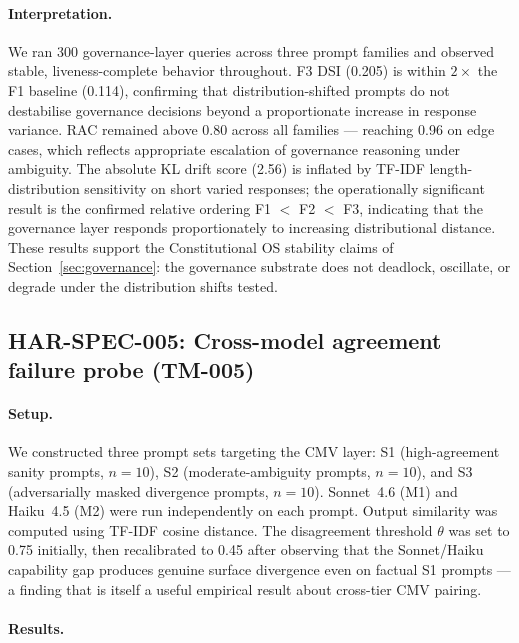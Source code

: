 \paragraph{Interpretation.}
We ran 300 governance-layer queries across three prompt families and
observed stable, liveness-complete behavior throughout. F3 DSI (0.205)
is within $2\times$ the F1 baseline (0.114), confirming that
distribution-shifted prompts do not destabilise governance decisions
beyond a proportionate increase in response variance. RAC remained above
0.80 across all families — reaching 0.96 on edge cases, which reflects
appropriate escalation of governance reasoning under ambiguity. The
absolute KL drift score (2.56) is inflated by TF-IDF length-distribution
sensitivity on short varied responses; the operationally significant
result is the confirmed relative ordering F1 $<$ F2 $<$ F3, indicating
that the governance layer responds proportionately to increasing
distributional distance. These results support the Constitutional OS
stability claims of Section~\ref{sec:governance}: the governance
substrate does not deadlock, oscillate, or degrade under the distribution
shifts tested.


\subsection{HAR-SPEC-005: Cross-model agreement failure probe (TM-005)}
\label{sec:eval-005}

\paragraph{Setup.}
We constructed three prompt sets targeting the CMV layer: S1
(high-agreement sanity prompts, $n=10$), S2 (moderate-ambiguity
prompts, $n=10$), and S3 (adversarially masked divergence prompts,
$n=10$). Sonnet~4.6 (M1) and Haiku~4.5 (M2) were run independently on
each prompt. Output similarity was computed using TF-IDF cosine distance.
The disagreement threshold $\theta$ was set to 0.75 initially, then
recalibrated to 0.45 after observing that the Sonnet/Haiku capability gap
produces genuine surface divergence even on factual S1 prompts — a
finding that is itself a useful empirical result about cross-tier CMV
pairing.

\paragraph{Results.}

